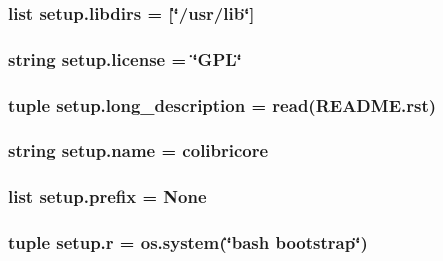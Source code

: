 \subsubsection[{libdirs}]{\setlength{\rightskip}{0pt plus 5cm}list setup.\+libdirs = \mbox{[}\char`\"{}/usr/lib\char`\"{}\mbox{]}}\label{namespacesetup_ab9de893f1a15246aa1d0172dd4ec87df}
\hypertarget{namespacesetup_aae5aa7c9d1cf462778a54e8f6a874c6f}{}
\subsubsection[{license}]{\setlength{\rightskip}{0pt plus 5cm}string setup.\+license = \char`\"{}G\+P\+L\char`\"{}}\label{namespacesetup_aae5aa7c9d1cf462778a54e8f6a874c6f}
\hypertarget{namespacesetup_acaf26e8be236d4bfa129f4c0f4f53baf}{}
\subsubsection[{long\+\_\+description}]{\setlength{\rightskip}{0pt plus 5cm}tuple setup.\+long\+\_\+description = {\bf read}(\textquotesingle{}R\+E\+A\+D\+M\+E.\+rst\textquotesingle{})}\label{namespacesetup_acaf26e8be236d4bfa129f4c0f4f53baf}
\hypertarget{namespacesetup_a61de3710bf6c9d78c0afa352263f8b09}{}
\subsubsection[{name}]{\setlength{\rightskip}{0pt plus 5cm}string setup.\+name = \textquotesingle{}colibricore\textquotesingle{}}\label{namespacesetup_a61de3710bf6c9d78c0afa352263f8b09}
\hypertarget{namespacesetup_a69aaefa467dfdcf65b2d794e63c13139}{}
\subsubsection[{prefix}]{\setlength{\rightskip}{0pt plus 5cm}list setup.\+prefix = None}\label{namespacesetup_a69aaefa467dfdcf65b2d794e63c13139}
\hypertarget{namespacesetup_a06ee05034472b3a3588ff7e39df2e4c3}{}
\subsubsection[{r}]{\setlength{\rightskip}{0pt plus 5cm}tuple setup.\+r = os.\+system(\char`\"{}bash bootstrap\char`\"{})}\label{namespacesetup_a06ee05034472b3a3588ff7e39df2e4c3}
\hypertarget{namespacesetup_a62a0bb453fa5e76f22937f922ab4ad95}{}

